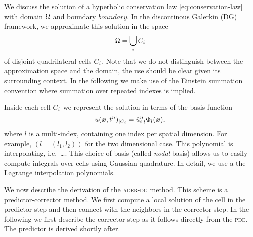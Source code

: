 We discuss the solution of a hyperbolic conservation law \cref{eq:conservation-law} with domain $\Omega$ and boundary $boundary$.
In the discontinous Galerkin (DG) framework, we approximate this solution in the space
\begin{equation}
  \label{eq:dg-space}
  \broken = \bigcup_i \cell
\end{equation}
of disjoint quadrilateral cells $C_{i}$.
Note that we do not distinguish between the approximation space and the domain, the use should be clear given its surrounding context.
In the following we make use of the Einstein summation convention where summation over repeated indexes is implied.

Inside each cell $C_{i}$ we represent the solution in terms of the basis function 
\begin{equation}
  \label{eq:cell-approx}
  u(\bm{x}, t^n)_{|\cell[i]} = \hat{u}^n_{i,l} \sbasis{l}(\bm{x}),
\end{equation}
where $l$ is a multi-index, containing one index per spatial dimension.
For example, $(l = (l_1, l_2))$ for the two dimensional case.
This polynomial is interpolating, i.e.\ \ldots{}.
This choice of basis (called \textit{nodal} basis) allows us to easily compute integrals over cells using Gaussian quadrature.
In detail, we use a the Lagrange interpolation polynomials.

We now describe the derivation of the \textsc{ader-dg} method.
This scheme is a predictor-corrector method.
We first compute a local solution of the cell in the predictor step and then connect with the neighbors in the corrector step.
In the following we first describe the corrector step as it follows directly from the \textsc{pde}.
The predictor is derived shortly after.

